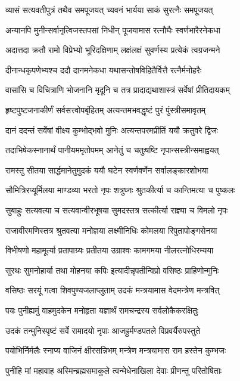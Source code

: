 \twolineshloka
{व्यासं सत्यवतीपुत्रं तथैव समपूजयत्}
{च्यवनं भार्यया साकं सुरत्नैः समपूजयत्}%

\twolineshloka
{अन्यानपि मुनीन्सर्वानृत्विजस्तपसां निधीन्}
{पूजयामास रत्नौघैः स्वर्णभारैरनेकधा}%

\twolineshloka
{अदात्तदा क्रतौ रामो विप्रेभ्यो भूरिदक्षिणाम्}
{लक्षंलक्षं सुवर्णस्य प्रत्येकं त्वग्रजन्मने}%

\twolineshloka
{दीनान्धकृपणेभ्यश्च ददौ दानमनेकधा}
{यथासन्तोषविहितैर्वित्तै रत्नैर्मनोहरैः}%

\twolineshloka
{वासांसि च विचित्राणि भोजनानि मृदूनि च}
{तत्र प्रादाद्यथाशास्त्रं सर्वेषां प्रीतिदायकम्}%

\twolineshloka
{हृष्टपुष्टजनाकीर्णं सर्वसत्त्वोपबृंहितम्}
{अत्यन्तमभवद्धृष्टं पुरं पुंस्त्रीसमावृतम्}%

\twolineshloka
{दानं ददन्तं सर्वेषां वीक्ष्य कुम्भोद्भवो मुनिः}
{अत्यन्तपरमप्रीतिं ययौ क्रतुवरे द्विजः}%

\twolineshloka
{तदाभिषेकस्नानार्थं पानीयममृतोपमम्}
{आनेतुं च चतुःषष्टि नृपान्सस्त्रीन्समाह्वयत्}%

\twolineshloka
{रामस्तु सीतया सार्द्धमानेतुमुदकं ययौ}
{घटेन स्वर्णवर्णेन सर्वालङ्कारशोभया}%

\twolineshloka
{सौमित्रिरप्यूर्मिलया माण्डव्या भरतो नृपः}
{शत्रुघ्नः श्रुतकीर्त्या च कान्तिमत्या च पुष्कलः}%

\twolineshloka
{सुबाहुः सत्यवत्या च सत्यवान्वीरभूषया}
{सुमदस्तत्र सत्कीर्त्या राज्ञ्या च विमलो नृपः}%

\twolineshloka
{राजावीरमणिस्तत्र श्रुतवत्या मनोज्ञया}
{लक्ष्मीनिधिः कोमलया रिपुतापोङ्गसेनया}%

\twolineshloka
{विभीषणो महामूर्त्या प्रतापाग्र्यः प्रतीतया}
{उग्राश्वः कामगमया नीलरत्नोधिरम्यया}%

\twolineshloka
{सुरथः सुमनोहार्या तथा मोहनया कपिः}
{इत्यादीन्नृपतीन्विप्रो वसिष्ठः प्राहिणोन्मुनिः}%

\twolineshloka
{वसिष्ठः सरयूं गत्वा शिवपुण्यजलाप्लुताम्}
{उदकं मन्त्रयामास वेदमन्त्रेण मन्त्रवित्}%

\twolineshloka
{पयः पुनीह्यमुं वाहमुदकेन मनोहृता}
{यज्ञार्थं रामचन्द्रस्य सर्वलोकैकरक्षितुः}%

\twolineshloka
{उदकं तन्मुनिस्पृष्टं सर्वे रामादयो नृपाः}
{आजह्रुर्मण्डपतले विप्रवर्यैरुपस्तुते}%

\twolineshloka
{पयोभिर्निर्मलैः स्नाप्य वाजिनं क्षीरसन्निभम्}
{मन्त्रेण मन्त्रयामास राम हस्तेन कुम्भजः}%

\twolineshloka
{पुनीहि मां महावाह अस्मिन्ब्रह्मसमाकुले}
{त्वन्मेधेनाखिला देवाः प्रीणन्तु परितोषिताः}%

